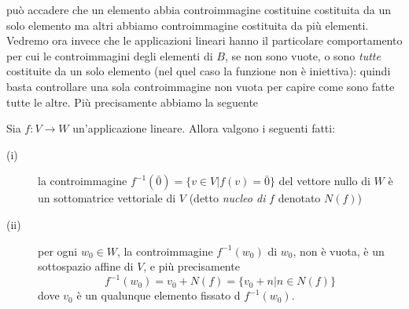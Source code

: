 può accadere che un elemento abbia controimmagine costituine costituita da un solo elemento ma altri abbiamo
controimmagine costituita da più elementi. Vedremo ora invece che le applicazioni lineari hanno il particolare
comportamento per cui le controimmagini degli elementi di $B$, se non sono vuote, o sono \textit{tutte}
costituite da un solo elemento (nel quel caso la funzione non è iniettiva): quindi basta controllare una sola
controimmagine non vuota per capire come sono fatte tutte le altre. Più precisamente abbiamo la seguente
\begin{proposizione}
  Sia $f: V\to W$ un'applicazione lineare. Allora valgono i seguenti fatti:
  \begin{description}
  \item[(i)] la controimmagine $f^{-1}(\bar{0})=\{v\in V | f(v)=\bar{0}\}$ del vettore nullo di $W$ è un
    sottomatrice vettoriale di $V$ (detto \textit{nucleo di} $f$ denotato $N(f)$)
  \item[(ii)] per ogni $w_0\in W$, la controimmagine $f^{-1}(w_0)$ di $w_0$,  non è vuota, è un sottospazio
    affine di $V$, e più precisamente
    \begin{equation*}
      f^{-1}(w_0)=v_0+N(f)=\{v_0+n|n\in N(f)\}
    \end{equation*}
    dove $v_0$ è un qualunque elemento fissato d $f^{-1}(w_0)$.
  \end{description}
\end{proposizione}
